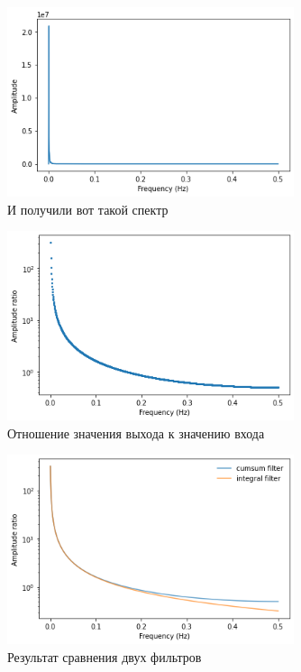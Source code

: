 \documentclass[a4paper, 12pt]{report}
\begin{document}
	\begin{figure}[H]
		\centering
		\includegraphics[width=0.75\textwidth]{test4.png}
		\caption{И получили вот такой спектр}
		\label{fig:test4}
	\end{figure}
	\begin{figure}[H]
		\centering
		\includegraphics[width=0.75\textwidth]{test5.png}
		\caption{Отношение значения выхода к значению входа}
		\label{fig:test5}
	\end{figure}
	\begin{figure}[H]
		\centering
		\includegraphics[width=0.75\textwidth]{test6.png}
		\caption{Результат сравнения двух фильтров}
		\label{fig:test6}
	\end{figure}
\end{document}
